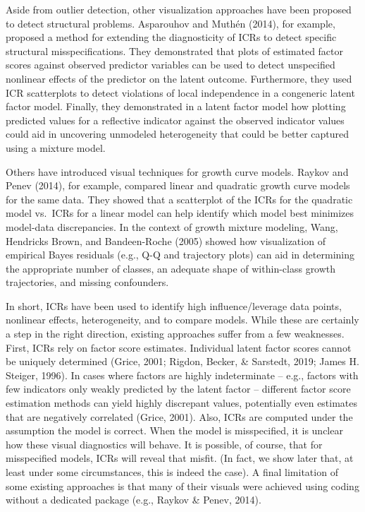 \documentclass[
  english,
  man]{apa6}
\begin{document}
Aside from outlier detection, other visualization approaches have been proposed to detect structural problems. Asparouhov and Muthén (2014), for example, proposed a method for extending the diagnosticity of ICRs to detect specific structural misspecifications. They demonstrated that plots of estimated factor scores against observed predictor variables can be used to detect unspecified nonlinear effects of the predictor on the latent outcome. Furthermore, they used ICR scatterplots to detect violations of local independence in a congeneric latent factor model. Finally, they demonstrated in a latent factor model how plotting predicted values for a reflective indicator against the observed indicator values could aid in uncovering unmodeled heterogeneity that could be better captured using a mixture model.

Others have introduced visual techniques for growth curve models. Raykov and Penev (2014), for example, compared linear and quadratic growth curve models for the same data. They showed that a scatterplot of the ICRs for the quadratic model vs.~ICRs for a linear model can help identify which model best minimizes model-data discrepancies. In the context of growth mixture modeling, Wang, Hendricks Brown, and Bandeen-Roche (2005) showed how visualization of empirical Bayes residuals (e.g., Q-Q and trajectory plots) can aid in determining the appropriate number of classes, an adequate shape of within-class growth trajectories, and missing confounders.

In short, ICRs have been used to identify high influence/leverage data points, nonlinear effects, heterogeneity, and to compare models. While these are certainly a step in the right direction, existing approaches suffer from a few weaknesses. First, ICRs rely on factor score estimates. Individual latent factor scores cannot be uniquely determined (Grice, 2001; Rigdon, Becker, \& Sarstedt, 2019; James H. Steiger, 1996). In cases where factors are highly indeterminate -- e.g., factors with few indicators only weakly predicted by the latent factor -- different factor score estimation methods can yield highly discrepant values, potentially even estimates that are negatively correlated (Grice, 2001). Also, ICRs are computed under the assumption the model is correct. When the model is misspecified, it is unclear how these visual diagnostics will behave. It is possible, of course, that for misspecified models, ICRs will reveal that misfit. (In fact, we show later that, at least under some circumstances, this is indeed the case). A final limitation of some existing approaches is that many of their visuals were achieved using coding without a dedicated package (e.g., Raykov \& Penev, 2014).
\end{document}
